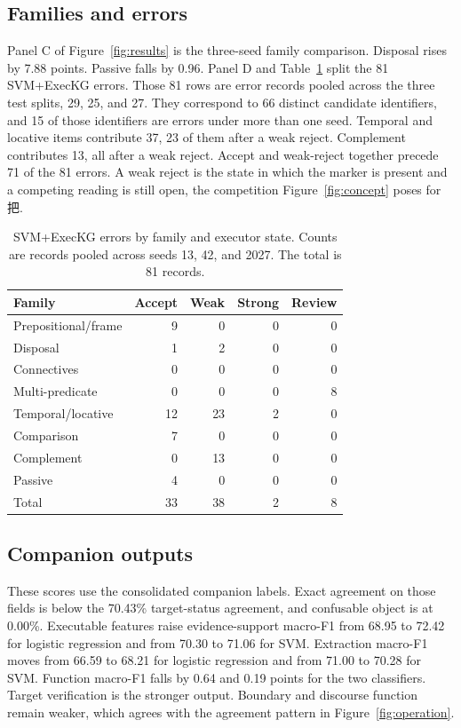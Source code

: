 \documentclass[pdflatex,sn-mathphys,NameDate]{sn-jnl}
\begin{document}
\subsection{Families and errors}

Panel C of Figure~\ref{fig:results} is the three-seed family comparison.
Disposal rises by 7.88 points.
Passive falls by 0.96.
Panel D and Table~\ref{tab:errors} split the 81 SVM+ExecKG errors.
Those 81 rows are error records pooled across the three test splits, 29, 25, and 27.
They correspond to 66 distinct candidate identifiers, and 15 of those identifiers are errors under more than one seed.
Temporal and locative items contribute 37, 23 of them after a weak reject.
Complement contributes 13, all after a weak reject.
Accept and weak-reject together precede 71 of the 81 errors.
A weak reject is the state in which the marker is present and a competing reading is still open, the competition Figure~\ref{fig:concept} poses for \mbox{把}.

\begin{table}[!ht]
\centering
\small
\begin{tabular}{lrrrr}
\toprule
Family & Accept & Weak & Strong & Review \\
\midrule
Prepositional/frame & 9 & 0 & 0 & 0 \\
Disposal & 1 & 2 & 0 & 0 \\
Connectives & 0 & 0 & 0 & 0 \\
Multi-predicate & 0 & 0 & 0 & 8 \\
Temporal/locative & 12 & 23 & 2 & 0 \\
Comparison & 7 & 0 & 0 & 0 \\
Complement & 0 & 13 & 0 & 0 \\
Passive & 4 & 0 & 0 & 0 \\
\midrule
Total & 33 & 38 & 2 & 8 \\
\bottomrule
\end{tabular}
\caption{SVM+ExecKG errors by family and executor state. Counts are records pooled across seeds 13, 42, and 2027. The total is 81 records.}
\label{tab:errors}
\end{table}

\subsection{Companion outputs}

These scores use the consolidated companion labels.
Exact agreement on those fields is below the 70.43\% target-status agreement, and confusable object is at 0.00\%.
Executable features raise evidence-support macro-F1 from 68.95 to 72.42 for logistic regression and from 70.30 to 71.06 for SVM.
Extraction macro-F1 moves from 66.59 to 68.21 for logistic regression and from 71.00 to 70.28 for SVM.
Function macro-F1 falls by 0.64 and 0.19 points for the two classifiers.
Target verification is the stronger output.
Boundary and discourse function remain weaker, which agrees with the agreement pattern in Figure~\ref{fig:operation}.
\end{document}
